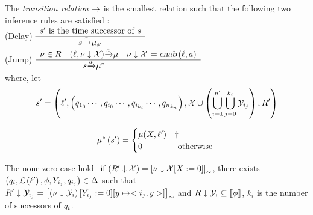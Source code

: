 \begin{definition}

The \emph{transition relation} $\rightarrow$ is the smallest relation such that the following two inference rules are satisfied : \\
(Delay)
$
    \begin{array}{c}
        s' \mbox{ is the time successor of } s \\
        \hline
        {s}{\xrightarrow{\tau}}{\mu_{s'}}
    \end{array}
$
\\
(Jump)
$
    \begin{array}{ccc}
        \nu \in R
        &
        {
                \left ( {\ell} , {{\nu} \downarrow {\mathcal{X}}} \right )
            }{\xrightarrow{a}}{\mu}
        &
        {\nu} \downarrow {\mathcal{X}} \models \mbox{\sl enab}\left( {\ell},{a} \right )
        \\
        \hline
        &
        {s}{\xrightarrow{a}}{\mu^*}
        &
    \end{array}
$
\\
where, let 
\\
$$
s' =  \left (
    \ell'
    ,
    \left (
        q_{1_0}
        \cdots,
        q_{i_0}
        \cdots,
        q_{i_{k_i}}
        \cdots,
        q_{n_{k_n}}
    \right )
    ,
    \mathcal{X} \cup \left(
        \bigcup_{i=1}^{n'} \bigcup_{j=0}^{k_i} \mathcal{Y}_{i_j}
    \right )
    ,
    R'
\right )
$$

\begin{align*}
    \mu^* \left (
       s'
    \right )
    = 
    \begin{cases}
        \mu(X,\ell')
        &
        \dag
        \\
        0
        & 
        \mbox{  otherwise }
    \end{cases}
\end{align*} 

The none zero case hold
$
    \mbox{ if } (
        {R'} \downarrow {\mathcal{X}}) 
        = 
        \left[
            {\nu} \downarrow {\mathcal{X}}
            [X := 0 ]
        \right]_\sim 
$, there exists
$
    \left (
        q_i,
        \mathcal{L}\left(\ell'\right),
        \phi,
        Y_{i_j},
        q_{i_j}
    \right) \in \Delta
$ 
such that \\
$
    {R'} \downarrow {\mathcal{Y}_{i_j}}
    = 
        \left[ \left (
                {\nu} \downarrow {\mathcal{Y}_{i}}
            \right) 
            [ Y_{i_j} := 0 ] 
            [ y \mapsto <i_j,y> ]
        \right]_\sim 
$ 
and 
$    
    {R} \downarrow {\mathcal{Y}_{i}}
    \subseteq {\llbracket}{\phi}{\rrbracket}
$,
$ k_i $ is the number of successors of $ q_i $. 
\end{definition}
